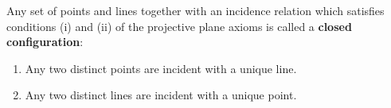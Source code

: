 Any set of points and lines together with an incidence relation which satisfies conditions (i) and (ii) of the projective plane axioms is called a \textbf{closed configuration}:

\begin{enumerate}
\item[(i)] Any two distinct points are incident with a unique line.
\item[(ii)] Any two distinct lines are incident with a unique point.
\end{enumerate}
